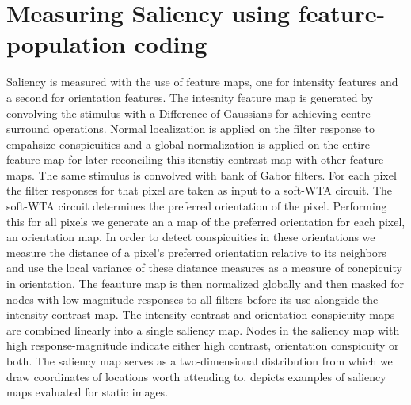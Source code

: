 \documentclass{report}
\begin{document}
\section{Measuring Saliency using feature-population coding}

Saliency is measured with the use of feature maps, one for intensity features and a second for orientation features. The intesnity feature map is generated by convolving the stimulus with a Difference of Gaussians for achieving centre-surround operations. Normal localization is applied on the filter response to empahsize conspicuities and a global normalization is applied on the entire feature map for later reconciling this itenstiy contrast map with other feature maps.  
The same stimulus is convolved with bank of Gabor filters. For each pixel the filter responses for that pixel are taken as input to a soft-WTA circuit. The soft-WTA circuit determines the preferred orientation of the pixel. Performing this for all pixels we generate an a map of the preferred orientation for each pixel, an orientation map. In order to detect conspicuities in these orientations we measure the distance of a pixel's preferred orientation relative to its neighbors and use the local variance of these diatance measures as a measure of concpicuity in orientation. The feauture map is then normalized globally and then masked for nodes with low magnitude responses to all filters before its use alongside the intensity contrast map.
The intensity contrast and orientation conspicuity maps are combined linearly into a single saliency map. Nodes in the saliency map with high response-magnitude indicate either high contrast, orientation conspicuity or both. The saliency map serves as a two-dimensional distribution from which we draw coordinates of locations worth attending to.  depicts examples of saliency maps evaluated for static images.
\end{document}

